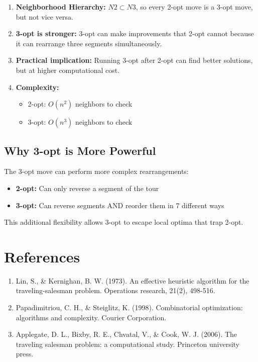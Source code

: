 \documentclass[12pt,a4paper]{article}
\begin{document}
\begin{enumerate}
    \item \textbf{Neighborhood Hierarchy:} $N2 \subset N3$, so every 2-opt move is a 3-opt move, but not vice versa.
    
    \item \textbf{3-opt is stronger:} 3-opt can make improvements that 2-opt cannot because it can rearrange three segments simultaneously.
    
    \item \textbf{Practical implication:} Running 3-opt after 2-opt can find better solutions, but at higher computational cost.
    
    \item \textbf{Complexity:}
    \begin{itemize}
        \item 2-opt: $O(n^2)$ neighbors to check
        \item 3-opt: $O(n^3)$ neighbors to check
    \end{itemize}
\end{enumerate}

\subsection{Why 3-opt is More Powerful}

The 3-opt move can perform more complex rearrangements:

\begin{itemize}
    \item \textbf{2-opt:} Can only reverse a segment of the tour
    \item \textbf{3-opt:} Can reverse segments AND reorder them in 7 different ways
\end{itemize}

This additional flexibility allows 3-opt to escape local optima that trap 2-opt.

\section{References}

\begin{enumerate}
    \item Lin, S., \& Kernighan, B. W. (1973). An effective heuristic algorithm for the traveling-salesman problem. Operations research, 21(2), 498-516.
    
    \item Papadimitriou, C. H., \& Steiglitz, K. (1998). Combinatorial optimization: algorithms and complexity. Courier Corporation.
    
    \item Applegate, D. L., Bixby, R. E., Chvatal, V., \& Cook, W. J. (2006). The traveling salesman problem: a computational study. Princeton university press.
\end{enumerate}
\end{document}

